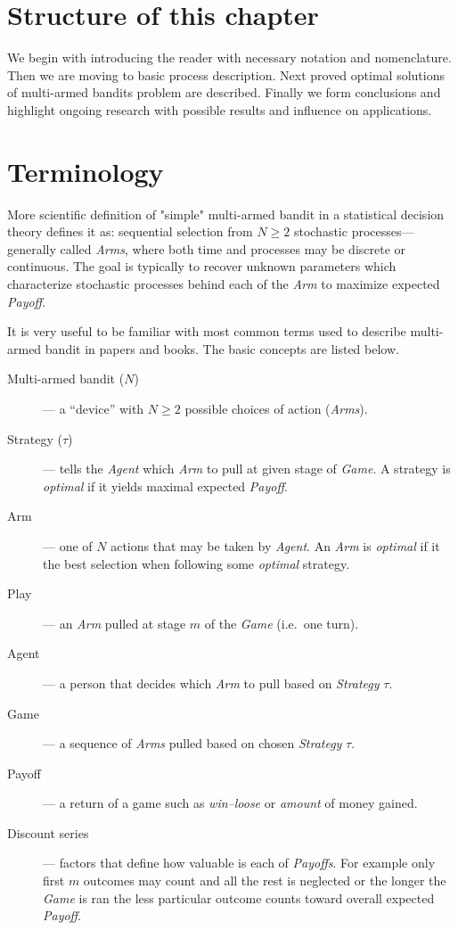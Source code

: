 \documentclass[12pt, a4paper, pdflatex]{report}
\begin{document}
\section{Structure of this chapter}
We begin with introducing the reader with necessary notation and nomenclature. Then we are moving to basic process description. Next proved optimal solutions of multi-armed bandits problem are described. Finally we form conclusions and highlight ongoing research with possible results and influence on applications.


\section{Terminology}
More scientific definition of "simple" multi-armed bandit in a statistical decision theory defines it as: sequential selection from $N \geq 2$ stochastic processes--- generally called \emph{Arms}, where both time and processes may be discrete or continuous. The goal is typically to recover unknown parameters which characterize stochastic processes behind each of the \emph{Arm} to maximize expected \emph{Payoff}.

It is very useful to be familiar with most common terms used to describe multi-armed bandit in papers and books. The basic concepts are listed below.
\begin{description}
\item[Multi-armed bandit ($N$)]--- a ``device'' with $N \geq 2$ possible choices of action (\emph{Arms}).
\item[Strategy ($\tau$)]--- tells the \emph{Agent} which \emph{Arm} to pull at given stage of \emph{Game}. A strategy is \emph{optimal} if it yields maximal expected \emph{Payoff}.
\item[Arm]--- one of $N$ actions that may be taken by \emph{Agent}. An \emph{Arm} is \emph{optimal} if it the best selection when following some \emph{optimal} strategy.
\item[Play]--- an \emph{Arm} pulled at stage $m$ of the \emph{Game} (i.e.\ one turn).
\item[Agent]--- a person that decides which \emph{Arm} to pull based on \emph{Strategy} $\tau$.
\item[Game]--- a sequence of \emph{Arms} pulled based on chosen \emph{Strategy} $\tau$.
\item[Payoff]--- a return of a game such as \emph{win--loose} or \emph{amount} of money gained.
\item[Discount series]--- factors that define how valuable is each of \emph{Payoffs}. For example only first $m$ outcomes may count and all the rest is neglected or the longer the \emph{Game} is ran the less particular outcome counts toward overall expected \emph{Payoff}.
\end{description}
\end{document}
